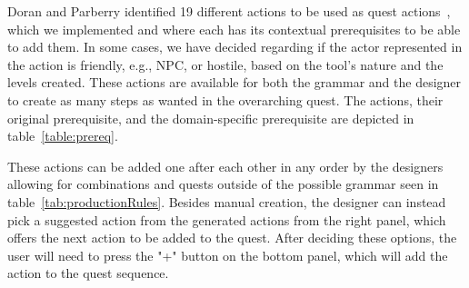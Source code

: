 



Doran and Parberry identified 19 different actions to be used as quest actions~, which we implemented and where each has its contextual prerequisites to be able to add them. In some cases, we have decided regarding if the actor represented in the action is friendly, e.g., NPC, or hostile, based on the tool's nature and the levels created. These actions are available for both the grammar and the designer to create as many steps as wanted in the overarching quest. The actions, their original prerequisite, and the domain-specific prerequisite are depicted in table~\ref{table:prereq}. 

These actions can be added one after each other in any order by the designers allowing for combinations and quests outside of the possible grammar seen in table~\ref{tab:productionRules}. Besides manual creation, the designer can instead pick a suggested action from the generated actions from the right panel, which offers the next action to be added to the quest. After deciding these options, the user will need to press the "+" button on the bottom panel, which will add the action to the quest sequence.






